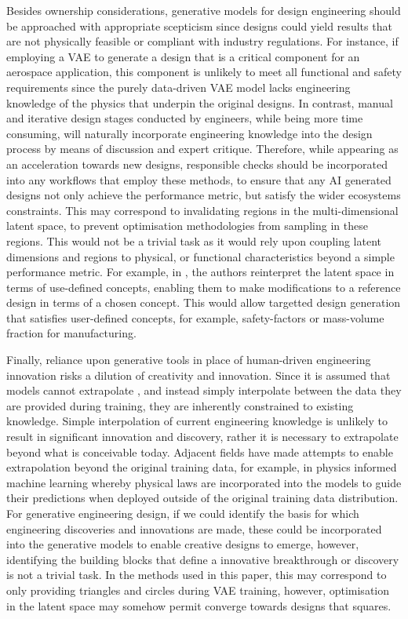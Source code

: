 \documentclass{article}
\begin{document}
Besides ownership considerations, generative models for design engineering should be approached with appropriate scepticism since designs could yield results that are not physically feasible or compliant with industry regulations. For instance, if employing a VAE to generate a design that is a critical component for an aerospace application, this component is unlikely to meet all functional and safety requirements since the purely data-driven VAE model lacks engineering knowledge of the physics that underpin the original designs. In contrast, manual and iterative design stages conducted by engineers, while being more time consuming, will naturally incorporate engineering knowledge into the design process by means of discussion and expert critique. Therefore, while appearing as an acceleration towards new designs, responsible checks should be incorporated into any workflows that employ these methods, to ensure that any AI generated designs not only achieve the performance metric, but satisfy the wider ecosystems constraints. This may correspond to invalidating regions in the multi-dimensional latent space, to prevent optimisation methodologies from sampling in these regions. This would not be a trivial task as it would rely upon coupling latent dimensions and regions to physical, or functional characteristics beyond a simple performance metric. For example, in \cite{Druc2022}, the authors reinterpret the latent space in terms of use-defined concepts, enabling them to make modifications to a reference design in terms of a chosen concept. This would allow targetted design generation that satisfies user-defined concepts, for example, safety-factors or mass-volume fraction for manufacturing.

Finally, reliance upon generative tools in place of human-driven engineering innovation risks a dilution of creativity and innovation. Since it is assumed that models cannot extrapolate \citep{Yousefzadeh2022}, and instead simply interpolate between the data they are provided during training, they are inherently constrained to existing knowledge. Simple interpolation of current engineering knowledge is unlikely to result in significant innovation and discovery, rather it is necessary to extrapolate beyond what is conceivable today. Adjacent fields have made attempts to enable extrapolation beyond the original  training data, for example, in physics informed machine learning \citep{Karniadakis2021} whereby physical laws are incorporated into the models to guide their predictions when deployed outside of the original training data distribution. For generative engineering design, if we could identify the basis for which engineering discoveries and innovations are made, these could be incorporated into the generative models to enable creative designs to emerge, however, identifying the building blocks that define a innovative breakthrough or discovery is not a trivial task. In the methods used in this paper, this may correspond to only providing triangles and circles during VAE training, however, optimisation in the latent space may somehow permit converge towards designs that squares.
\end{document}
